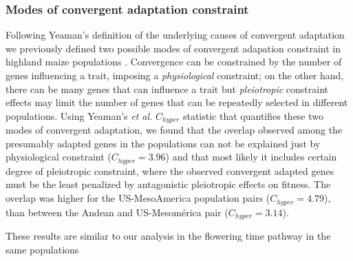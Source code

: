 \documentclass[9pt,twocolumn,twoside]{BioRxiv}
\begin{document}
\subsubsection{Modes of convergent adaptation constraint} 
Following Yeaman's \cite{yeaman2018} definition of the underlying causes of convergent adaptation we previously defined two possible modes of convergent adapation constraint in highland maize populations \cite{Wang2020-mp}. 
Convergence can be constrained by the number of genes influencing a trait, imposing a \textit{physiological} constraint; on the other hand, there can be many genes that can influence a trait but \textit{pleiotropic} constraint effects may limit the number of genes that can be repeatedly selected in different populations. 
Using Yeaman's \textit{et al.} $C_{hyper}$ statistic \cite{yeaman2018} that quantifies these two modes of convergent adaptation, we found that the overlap observed among the presumably adapted genes in the populations can not be explained just by physiological constraint ($C_{hyper} = 3.96$) and that most likely it includes certain degree of pleiotropic constraint, where the observed convergent adapted genes must be the least penalized by antagonistic pleiotropic effects on fitness.
The overlap was higher for the US-MesoAmerica population pairs ($C_{hyper} = 4.79$), than between the Andean and US-Mesomérica pair ($C_{hyper} = 3.14$).

These results are similar to our analysis in the flowering time pathway in the same populations \cite{Wang2020-mp} 
\end{document}
